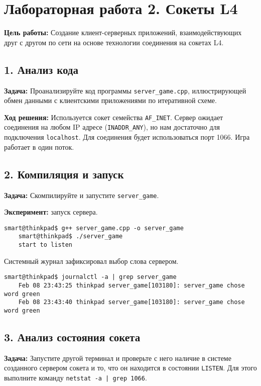 \chapter*{Лабораторная работа 2. Сокеты L4}

\textbf{Цель работы:} Создание клиент-серверных приложений, взаимодействующих друг с другом по сети на основе технологии соединения на сокетах L4.

\section*{1. Анализ кода}
\textbf{Задача:} Проанализируйте код программы \texttt{server\_game.cpp}, иллюстрирующей обмен данными с клиентскими приложениями по итеративной схеме.

\textbf{Ход решения:} Используется сокет семейства \texttt{AF\_INET}. Сервер ожидает соединения на любом IP адресе (\texttt{INADDR\_ANY}), но нам достаточно для подключения \texttt{localhost}. Для соединения будет использоваться порт 1066. Игра работает в один поток.

\section*{2. Компиляция и запуск}
\textbf{Задача:} Скомпилируйте и запустите \texttt{server\_game}.

\textbf{Эксперимент:} запуск сервера.
\begin{Verbatim}[frame=single]
    smart@thinkpad$ g++ server_game.cpp -o server_game
    smart@thinkpad$ ./server_game 
    start to listen

\end{Verbatim}

Системный журнал зафиксировал выбор слова сервером.
\begin{Verbatim}[frame=single]
    smart@thinkpad$ journalctl -a | grep server_game
    Feb 08 23:43:25 thinkpad server_game[103180]: server_game chose word green
    Feb 08 23:43:40 thinkpad server_game[103180]: server_game chose word green
\end{Verbatim}

\section*{3. Анализ состояния сокета}
\textbf{Задача:} Запустите другой терминал и проверьте с него наличие в системе созданного сервером сокета и то, что он находится в состоянии \texttt{LISTEN}. Для этого выполните команду \texttt{netstat -a | grep 1066}.

